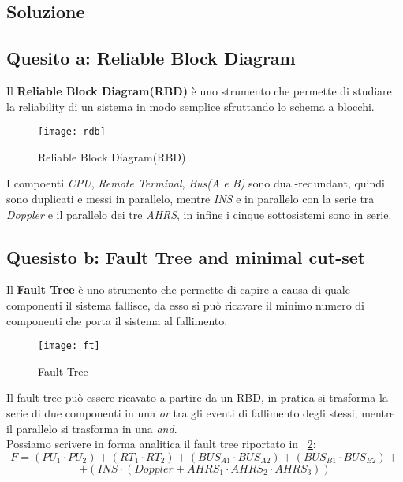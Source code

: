 \clearpage
\subsection{Soluzione}

\subsection{Quesito a: Reliable Block Diagram}

Il \textbf{Reliable Block Diagram(RBD)} è uno strumento che permette di studiare
la reliability di un sistema in modo semplice sfruttando lo schema a blocchi.\\

\begin{figure}[!htbp]
  \centering
  \texttt{[image: rdb]}
  \caption{Reliable Block Diagram(RBD)}
  \label{rdb}
\end{figure}

I compoenti \textit{CPU}, \textit{Remote Terminal}, \textit{Bus(A e B)} sono
dual-redundant, quindi sono duplicati e messi in parallelo, mentre \textit{INS} e
in parallelo con la serie tra \textit{Doppler} e il parallelo dei tre \textit{AHRS},
in infine i cinque sottosistemi sono in serie.

\subsection{Quesisto b: Fault Tree and minimal cut-set}

Il \textbf{Fault Tree} è uno strumento che permette di capire a causa di quale
componenti il sistema fallisce, da esso si può ricavare il minimo numero di
componenti che porta il sistema al fallimento.

\begin{figure}[!htbp]
  \centering
  \texttt{[image: ft]}
  \caption{Fault Tree}
  \label{ft}
\end{figure}

Il fault tree può essere ricavato a partire da un RBD, in pratica si trasforma
la serie di due componenti in una \textit{or} tra gli eventi di fallimento degli stessi,
mentre il parallelo si trasforma in una \textit{and}.\\

Possiamo scrivere in forma analitica il fault tree riportato in \figurename~\ref{ft}:
$$ F = (PU_1 \cdot PU_2) + (RT_1 \cdot RT_2) + (BUS_{A1} \cdot BUS_{A2}) + (BUS_{B1} \cdot BUS_{B2})+$$
$$+ (INS \cdot (Doppler+AHRS_1 \cdot AHRS_2 \cdot AHRS_3))$$


